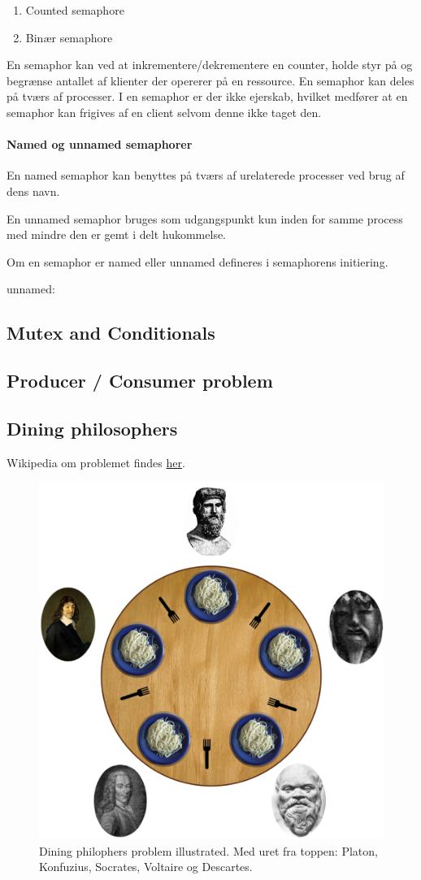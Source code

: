 \begin{enumerate}
	\item Counted semaphore
	\item Binær semaphore
\end{enumerate}

En semaphor kan ved at inkrementere/dekrementere en counter, holde styr på og begrænse antallet af klienter der opererer på en ressource. En semaphor kan deles på tværs af processer. I en semaphor er der ikke ejerskab, hvilket medfører at en semaphor kan frigives af en client selvom denne ikke taget den.

\paragraph{Named og unnamed semaphorer}
En named semaphor kan benyttes på tværs af urelaterede processer ved brug af dens navn.

En unnamed semaphor bruges som udgangspunkt kun inden for samme process med mindre den er gemt i delt hukommelse. 

Om en semaphor er named eller unnamed defineres i semaphorens initiering.

unnamed: 

\subsection{Mutex and Conditionals}

\subsection{Producer / Consumer problem}


\subsection{Dining philosophers}
Wikipedia om problemet findes \href{https://en.wikipedia.org/wiki/Dining_philosophers_problem}{her}.

\begin{figure}[h]
	\centering
	\includegraphics[width=0.5\linewidth]{figs/spm2/dining}
	\caption{Dining philophers problem illustrated. Med uret fra toppen: Platon, Konfuzius, Socrates, Voltaire og Descartes.}
	\label{fig:dining}
\end{figure}

